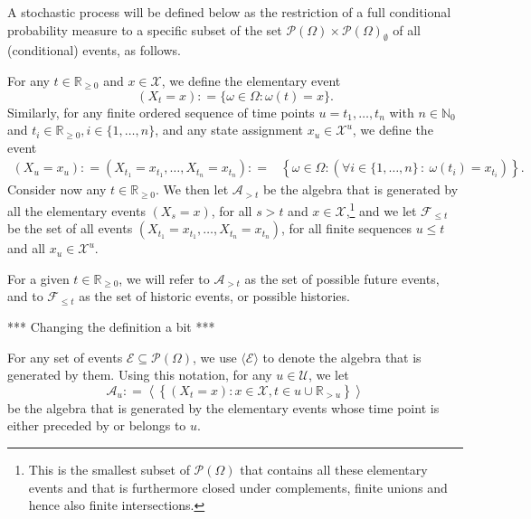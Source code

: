 \documentclass[10pt]{paper}
\theoremstyle{definition}
\newcommand{\nats}{\mathbb{N}}
\newcommand{\reals}{\mathbb{R}}
\newcommand{\realsnonneg}{\reals_{\geq 0}}
\newcommand{\states}{\mathcal{X}}
\newcommand{\paths}{\Omega}
\newcommand{\power}{\mathcal{P}(\paths)}
\newcommand{\nonemptypower}{\power_{\emptyset}}
\newcommand{\events}{\mathcal{E}}
\newcommand{\filter}[1][t]{\mathcal{F}_{#1}}
\newcommand{\coloneqq}{:\!=}
\begin{document}
A stochastic process will be defined below as the restriction of a full conditional probability measure to a specific subset of the set $\power\times\nonemptypower$ of all (conditional) events, as follows.

For any $t\in\realsnonneg$ and $x\in\states$, we define the elementary event
\begin{equation*}
(X_t=x)\coloneqq\{\omega\in\paths\colon\omega(t)=x\}.
\end{equation*}
Similarly, for any finite ordered sequence of time points $u=t_1,\ldots,t_n$ with $n\in\nats_0$ and $t_i\in\realsnonneg,i\in\{1,\ldots,n\}$, and any state assignment $x_u\in\states^u$, we define the event
\begin{align*}
(X_u=x_u)\coloneqq\left(X_{t_1}=x_{t_1}, \dots, X_{t_n}=x_{t_n}\right)
\coloneqq&
\left\{\omega\in\paths\colon(\forall i\in\{1,\dots,n\}\,:~\omega(t_i)=x_{t_i})\right\}.%
\end{align*}
Consider now any $t\in\realsnonneg$. We then let $\mathcal{A}_{>t}$ be the algebra that is generated by all the elementary events $(X_s=x)$, for all $s> t$ and $x\in\states$,\footnote{This is the smallest subset of $\power$ that contains all these elementary events and that is furthermore closed under complements, finite unions and hence also finite intersections.} and we let $\mathcal{F}_{\leq t}$ be the set of all events $\left(X_{t_1}=x_{t_1}, \dots, X_{t_n}=x_{t_n}\right)$, for all finite sequences $u\leq t$ and all $x_u\in\states^u$.%

For a given $t\in\realsnonneg$, we will refer to $\mathcal{A}_{> t}$ as the set of possible future events, and to $\mathcal{F}_{\leq t}$ as the set of historic events, or possible histories.

*** Changing the definition a bit ***

For any set of events $\mathcal{E}\subseteq\power$, we use $\langle\mathcal{E}\rangle$ to denote the algebra that is generated by them. Using this notation, for any $u\in\mathcal{U}$, we let
\begin{equation*}
\mathcal{A}_u
\coloneqq
\left\langle
\left\{
(X_t=x)
\colon
x\in\states,t\in u\cup\reals_{>u}
\right\}
\right\rangle
\end{equation*}
be the algebra that is generated by the elementary events whose time point is either preceded by or belongs to $u$.
\end{document}
